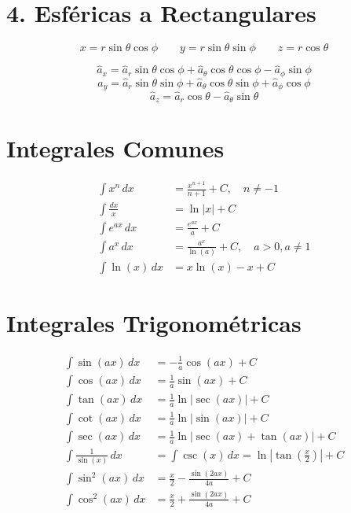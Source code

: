 \documentclass[11pt]{article}
\begin{document}
\section{4. Esféricas a Rectangulares}
\begin{equation}
x = r \sin \theta \cos \phi \qquad 
y = r \sin \theta \sin \phi \qquad 
z = r \cos \theta
\end{equation}


\begin{equation}
    \hat{a}_x = \hat{a}_r \sin \theta \cos \phi + \hat{a}_\theta \cos \theta \cos \phi - \hat{a}_\phi \sin \phi
\end{equation}
\begin{equation}
    \hat{a}_y = \hat{a}_r \sin \theta \sin \phi + \hat{a}_\theta \cos \theta \sin \phi + \hat{a}_\phi \cos \phi
\end{equation}
\begin{equation}
    \hat{a}_z = \hat{a}_r \cos \theta - \hat{a}_\theta \sin \theta
\end{equation}

\newpage

\section*{Integrales Comunes}

\begin{align}
    \int x^n \, dx &= \frac{x^{n+1}}{n+1} + C, \quad n \neq -1 \\[10pt]
    \int \frac{dx}{x} &= \ln|x| + C \\[10pt]
    \int e^{ax} \, dx &= \frac{e^{ax}}{a} + C \\[10pt]
    \int a^{x} \, dx &= \frac{a^{x}}{\ln(a)} + C, \quad a > 0, a \neq 1 \\[10pt]
    \int \ln(x) \, dx &= x \ln(x) - x + C
\end{align}

\section*{Integrales Trigonométricas}


\begin{align}
    \int \sin(ax) \, dx &= -\frac{1}{a} \cos(ax) + C \\[10pt]
    \int \cos(ax) \, dx &= \frac{1}{a} \sin(ax) + C \\[10pt]
    \int \tan(ax) \, dx &= \frac{1}{a} \ln|\sec(ax)| + C \\[10pt]
    \int \cot(ax) \, dx &= \frac{1}{a} \ln|\sin(ax)| + C \\[10pt]
    \int \sec(ax) \, dx &= \frac{1}{a} \ln|\sec(ax) + \tan(ax)| + C \\[10pt]
    \int \frac{1}{\sin(x)} \, dx &= \int \csc(x) \, dx = \ln \left| \tan\left( \frac{x}{2} \right) \right| + C \\[10pt]
    \int \sin^2(ax) \, dx &= \frac{x}{2} - \frac{\sin(2ax)}{4a} + C \\[10pt]
    \int \cos^2(ax) \, dx &= \frac{x}{2} + \frac{\sin(2ax)}{4a} + C
\end{align}
\end{document}
